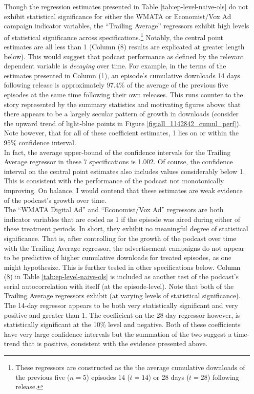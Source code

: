 \documentclass[11pt, letterpaper, twoside]{article}
\begin{document}
Though the regression estimates presented in Table \ref{tab:ep-level-naive-ols} do not exhibit statistical significance for either the WMATA or Economist/Vox Ad campaign indicator variables, the ``Trailing Average'' regressors exhibit high levels of statistical significance across specifications.\footnote{These regressors are constructed as the the average cumulative downloads of the previous five ($n=5$) episodes 14 ($t=14$) or 28 days ($t=28$) following release.} Notably, the central point estimates are all less than 1 (Column (8) results are explicated at greater length below). This would suggest that podcast performance as defined by the relevant dependent variable is \textit{decaying} over time. For example, in the terms of the estimates presented in Column (1), an episode's cumulative downloads 14 days following release is approximately 97.4\% of the average of the previous five episodes at the same time following their own releases. This runs counter to the story represented by the summary statistics and motivating figures above: that there appears to be a largely secular pattern of growth in downloads (consider the upward trend of light-blue points in Figure \ref{fig:all_1142842_cumul_perf}). Note however, that for all of these coefficient estimates, 1 lies on or within the 95\% confidence interval.\\

In fact, the average upper-bound of the confidence intervals for the Trailing Average regressor in these 7 specifications is 1.002. Of course, the confidence interval on the central point estimates also includes values considerably below 1. This is consistent with the performance of the podcast not monotonically improving. On balance, I would contend that these estimates are weak evidence of the podcast's growth over time.\\


The ``WMATA Digital Ad'' and ``Economist/Vox Ad'' regressors are both indicator variables that are coded as 1 if the episode was aired during either of these treatment periods. In short, they exhibit no meaningful degree of statistical significance. That is, after controlling for the growth of the podcast over time with the Trailing Average regressor, the advertisement campaigns do not appear to be predictive of higher cumulative downloads for treated episodes, as one might hypothesize. This is further tested in other specifications below. Column (8) in Table \ref{tab:ep-level-naive-ols} is included as another test of the podcast's serial autocorrelation with itself (at the episode-level). Note that both of the Trailing Average regressors exhibit (at varying levels of statistical significance). The 14-day regressor appears to be both very statistically significant and very positive and greater than 1. The coefficient on the 28-day regressor however, is statistically significant at the 10\% level and negative. Both of these coefficients have very large confidence intervals but the summation of the two suggest a time-trend that is positive, consistent with the evidence presented above.
\end{document}
